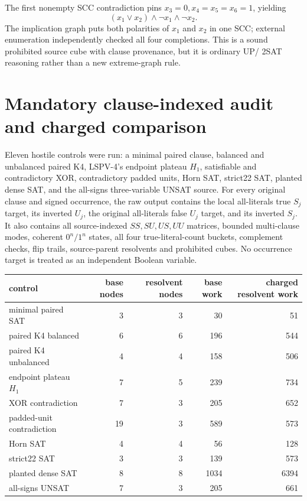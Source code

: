 \documentclass[11pt]{article}
\begin{document}
The first nonempty SCC contradiction pins
$x_3=0,x_4=x_5=x_6=1$, yielding
\[
 (x_1\vee x_2)\wedge\neg x_1\wedge\neg x_2.
\]
The implication graph puts both polarities of $x_1$ and $x_2$ in one SCC;
external enumeration independently checked all four completions.  This is a
sound prohibited source cube with clause provenance, but it is ordinary UP/
2SAT reasoning rather than a new extreme-graph rule.

\section{Mandatory clause-indexed audit and charged comparison}

Eleven hostile controls were run: a minimal paired clause, balanced and
unbalanced paired K4, LSPV-4's endpoint plateau $H_1$, satisfiable and
contradictory XOR, contradictory padded units, Horn SAT, strict22 SAT, planted
dense SAT, and the all-signs three-variable UNSAT source.  For every original
clause and signed occurrence, the raw output contains the local all-literals
true $S_j$ target, its inverted $U_j$, the original all-literals false $U_j$
target, and its inverted $S_j$.  It also contains all source-indexed
$SS,SU,US,UU$ matrices, bounded multi-clause modes, coherent $0^n/1^n$ states,
all four true-literal-count buckets, complement checks, flip trails,
source-parent resolvents and prohibited cubes.  No occurrence target is
treated as an independent Boolean variable.

\begin{center}\small
\begin{tabular}{lrrrr}
\toprule
control & base nodes & resolvent nodes & base work & charged resolvent work\\
\midrule
minimal paired SAT &3&3&30&51\\
paired K4 balanced &6&6&196&544\\
paired K4 unbalanced &4&4&158&506\\
endpoint plateau $H_1$ &7&5&239&734\\
XOR contradiction &7&3&205&652\\
padded-unit contradiction &19&3&589&573\\
Horn SAT &4&4&56&128\\
strict22 SAT &3&3&139&573\\
planted dense SAT &8&8&1034&6394\\
all-signs UNSAT &7&3&205&661\\
\bottomrule
\end{tabular}
\end{center}
\end{document}
